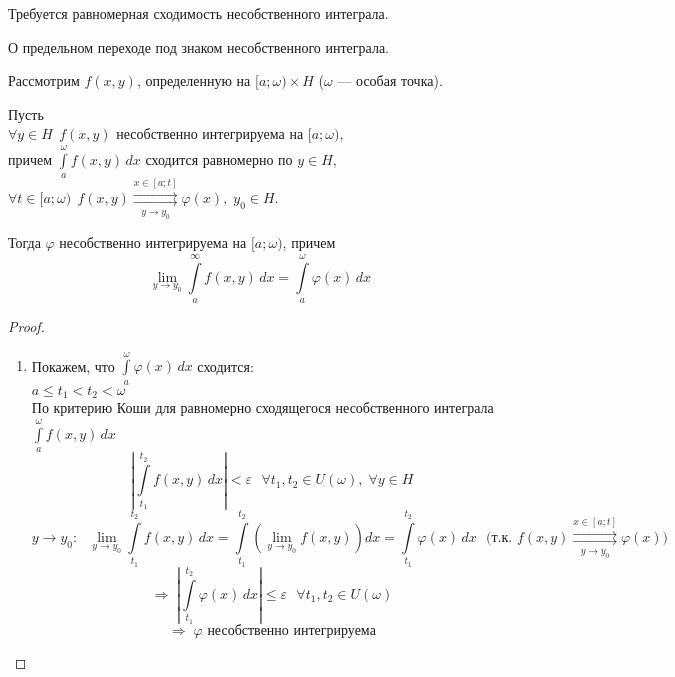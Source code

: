 \begin{properties}
\begin{enumerate}
        Требуется равномерная сходимость несобственного интеграла.
        
        \begin{theorem*} О предельном переходе под знаком несобственного интеграла.
        
            Рассмотрим $f(x, y)$, определенную на $[a; \omega) \times H$ ($\omega$ --- особая точка).
            
            Пусть \\
            \phantom{Пусть} $\forall y \in H \ \ f(x, y)$ несобственно интегрируема на $[a; \omega)$, \\
            \phantom{Пусть} причем $\int\limits_{a}^{\omega} f(x, y)\,dx$ сходится равномерно по $y \in H$, \\
            \phantom{Пусть} $\forall t \in [a; \omega) \ \ 
            f(x, y) \overset{x \in [a; t]}{\underset{y \to y_0}{\rightrightarrows}} \varphi(x), \; y_0 \in H$.
            
            Тогда $\varphi$ несобственно интегрируема на $[a; \omega)$, причем 
            \[ \lim_{y \to y_0} \int\limits_{a}^{\infty} f(x, y)\,dx = \int\limits_{a}^{\omega} \varphi(x)\,dx \]
        \end{theorem*}
        \begin{proof}
        \begin{enumerate}
            \item Покажем, что $\int\limits_{a}^{\omega} \varphi(x)\,dx$ сходится: \\[5 pt]
            $a \le t_1 < t_2 < \omega$ \\[3 pt]
            По критерию Коши для равномерно сходящегося несобственного интеграла $\int\limits_{a}^{\omega} f(x, y)\,dx$
            \[ \left| \int\limits_{t_1}^{t_2} f(x, y)\,dx \right| < \varepsilon \ \ \ \forall t_1, t_2 \in U(\omega), \; \forall y \in H \]
            \[ y \to y_0: \ \ \ \lim_{y \to y_0} \int\limits_{t_1}^{t_2} f(x, y)\,dx = 
            \int\limits_{t_1}^{t_2} \left( \lim_{y \to y_0} f(x, y) \right) dx = \int\limits_{t_1}^{t_2} \varphi(x)\,dx \ \ \ 
            \text{(т.к. $f(x, y) \overset{x \in [a; t]}{\underset{y \to y_0}{\rightrightarrows}} \varphi(x)$)} \]
            \[ \Rightarrow\; \left| \int\limits_{t_1}^{t_2} \varphi(x)\,dx \right| \le \varepsilon \ \ \ \forall t_1, t_2 \in U(\omega) \]
            \[ \Rightarrow\; \varphi \text{ несобственно интегрируема} \]
            

\end{enumerate}
\end{proof}
\end{enumerate}
\end{properties}
